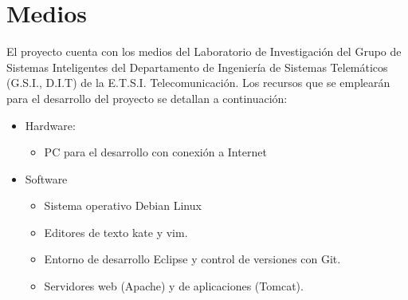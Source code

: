 \documentclass[a4paper,11pt]{report}
\begin{document}
\chapter*{Medios}\vspace{-1ex}

El proyecto cuenta con los medios del Laboratorio de Investigación del Grupo de
Sistemas Inteligentes del Departamento de Ingeniería de Sistemas Telemáticos (G.S.I.,
D.I.T) de la E.T.S.I. Telecomunicación. Los recursos que se emplearán para el desarrollo
del proyecto se detallan a continuación:
\begin{itemize}
  \item Hardware:
  \begin{itemize}
    \item PC para el desarrollo con conexión a Internet
  \end{itemize}
  \item Software
  \begin{itemize}
    \item Sistema operativo Debian Linux
    \item Editores de texto kate y vim.
    \item Entorno de desarrollo Eclipse y control de versiones con Git.
    \item Servidores web (Apache) y de aplicaciones (Tomcat).
  \end{itemize}
\end{itemize}

\vspace{-3ex}
{
\let\clearpage\relax
\small

}
\end{document}
